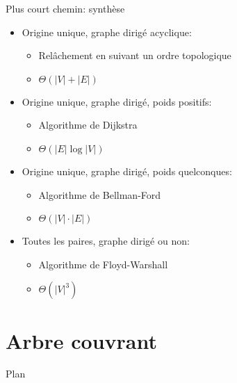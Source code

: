 \begin{frame}{Plus court chemin: synthèse}

\begin{itemize}
\item Origine unique, graphe dirigé acyclique:
\begin{itemize}
\item Relâchement en suivant un ordre topologique
\item $\Theta(|V|+|E|)$
\end{itemize}
\item Origine unique, graphe dirigé, poids positifs:
\begin{itemize}
\item Algorithme de Dijkstra
\item $\Theta(|E|\log |V|)$
\end{itemize}
\item Origine unique, graphe dirigé, poids quelconques:
\begin{itemize}
\item Algorithme de Bellman-Ford
\item $\Theta(|V|\cdot |E|)$
\end{itemize}
\item Toutes les paires, graphe dirigé ou non:
\begin{itemize}
\item Algorithme de Floyd-Warshall
\item $\Theta(|V|^3)$
\end{itemize}
\end{itemize}


\end{frame}

\section{Arbre couvrant}

\begin{frame}{Plan}

\tableofcontents[currentsection]

\end{frame}

